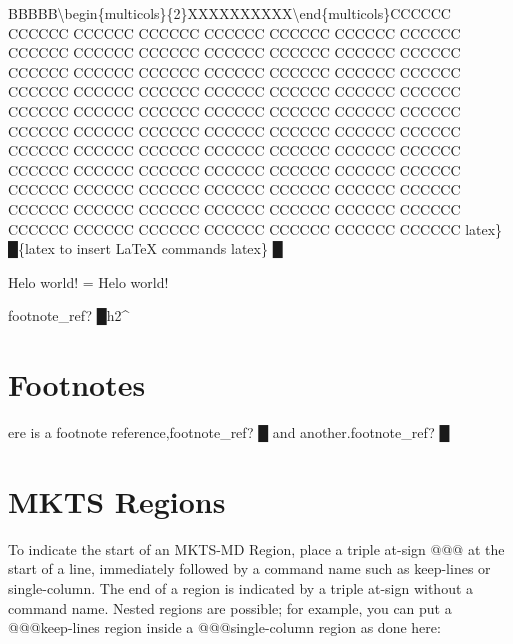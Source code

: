 BBBBB\textbackslash{}begin\{multicols\}\{2\}XXXXXXXXXX\textbackslash{}end\{multicols\}CCCCCC CCCCCC CCCCCC CCCCCC CCCCCC CCCCCC CCCCCC CCCCCC CCCCCC CCCCCC
CCCCCC CCCCCC CCCCCC CCCCCC CCCCCC CCCCCC CCCCCC CCCCCC CCCCCC CCCCCC CCCCCC CCCCCC CCCCCC CCCCCC CCCCCC CCCCCC CCCCCC
CCCCCC CCCCCC CCCCCC CCCCCC CCCCCC CCCCCC CCCCCC CCCCCC CCCCCC CCCCCC CCCCCC CCCCCC CCCCCC CCCCCC CCCCCC CCCCCC CCCCCC
CCCCCC CCCCCC CCCCCC CCCCCC CCCCCC CCCCCC CCCCCC CCCCCC CCCCCC CCCCCC CCCCCC CCCCCC CCCCCC CCCCCC CCCCCC CCCCCC CCCCCC
CCCCCC CCCCCC CCCCCC CCCCCC CCCCCC CCCCCC CCCCCC CCCCCC CCCCCC CCCCCC CCCCCC CCCCCC CCCCCC CCCCCC CCCCCC CCCCCC CCCCCC
{\mktsStyleBold\color{violet}{\mktsStyleSymbol}latex\} {\mktsStyleSymbol█}}{\mktsStyleBold\color{violet}{\mktsStyleSymbol█}\{latex {\mktsStyleSymbol}}to insert LaTeX commands
{\mktsStyleBold\color{violet}{\mktsStyleSymbol}latex\} {\mktsStyleSymbol█}}
\mktsShowpar\par
\begin{multicols}{2}
\end{multicols}Helo {\mktsStyleCode{}world}! = Helo {\mktsStyleCode{}world}!\mktsShowpar\par
\begin{multicols}{2}{\mktsStyleBold\color{violet}{\mktsStyleSymbol}footnote\_ref? {\mktsStyleSymbol█}}h2\textasciicircum{}\mktsShowpar\par
\end{multicols}
\section{Footnotes
}
\begin{multicols}{2}ere is a footnote reference,{\mktsStyleBold\color{violet}{\mktsStyleSymbol}footnote\_ref? {\mktsStyleSymbol█}} and another.{\mktsStyleBold\color{violet}{\mktsStyleSymbol}footnote\_ref? {\mktsStyleSymbol█}}\mktsShowpar\par
\end{multicols}
\section{MKTS Regions 
}
\begin{multicols}{2}To indicate the start of an MKTS-MD Region, place a triple at-sign {\mktsStyleCode{}@@@}
at the start of a line, immediately followed by a command name such as
{\mktsStyleCode{}keep-lines} or {\mktsStyleCode{}single-column}. The end of a region is indicated by a
triple at-sign without a command name. Nested regions are possible; for example,
you can put a {\mktsStyleCode{}@@@keep-lines} region inside a {\mktsStyleCode{}@@@single-column} region as
done here:\mktsShowpar\par
\end{multicols}
